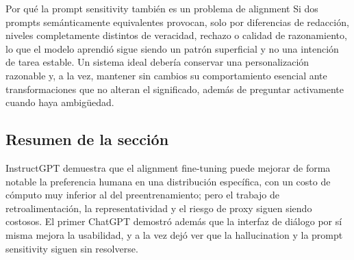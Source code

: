\begin{importantbox}{Por qué la prompt sensitivity también es un problema de alignment}
Si dos prompts semánticamente equivalentes provocan, solo por diferencias de redacción, niveles completamente distintos de veracidad, rechazo o calidad de razonamiento, lo que el modelo aprendió sigue siendo un patrón superficial y no una intención de tarea estable. Un sistema ideal debería conservar una personalización razonable y, a la vez, mantener sin cambios su comportamiento esencial ante transformaciones que no alteran el significado, además de preguntar activamente cuando haya ambigüedad.
\end{importantbox}

\subsection{Resumen de la sección}

InstructGPT demuestra que el alignment fine-tuning puede mejorar de forma notable la preferencia humana en una distribución específica, con un costo de cómputo muy inferior al del preentrenamiento; pero el trabajo de retroalimentación, la representatividad y el riesgo de proxy siguen siendo costosos. El primer ChatGPT demostró además que la interfaz de diálogo por sí misma mejora la usabilidad, y a la vez dejó ver que la hallucination y la prompt sensitivity siguen sin resolverse.
